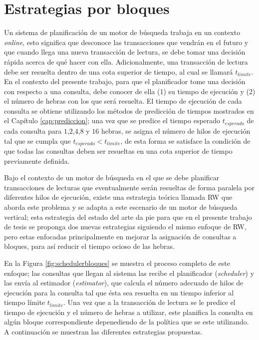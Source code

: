 \section{Estrategias por bloques}
\label{scheduling:bloques}
Un sistema de planificación de un motor de búsqueda trabaja en un contexto \textit{online}, esto significa que desconoce las transacciones que vendrán en el futuro y que cuando llega una nueva transacción de lectura, se debe tomar una decisión rápida acerca de qué hacer con ella. Adicionalmente, una transacción de lectura debe ser resuelta dentro de una cota superior de tiempo, al cual se llamará $t_{limite}$. En el contexto del presente trabajo, para que el planificador tome una decisión con respecto a una consulta, debe conocer de ella (1) su tiempo de ejecución y (2) el número de hebras con los que será resuelta. El tiempo de ejecución de cada consulta se obtiene utilizando los métodos de predicción de tiempos mostrados en el Capítulo \ref{cap:prediccion}; una vez que se predice el tiempo esperado $t_{esperado}$ de cada consulta para $1$,$2$,$4$,$8$ y $16$ hebras, se asigna el número de hilos de ejecución tal que se cumpla que $t_{esperado} < t_{limite}$, de esta forma se satisface la condición de que todas las consultas deben ser resueltas en una cota superior de tiempo previamente definida.

Bajo el contexto de un motor de búsqueda en el que se debe planificar transacciones de lecturas que eventualmente serán resueltas de forma paralela por diferentes hilos de ejecución, existe una estrategia teórica llamada RW que aborda este problema \citep{Ye:2007} y se adapta a este escenario de un motor de búsqueda vertical; esta estrategia del estado del arte da pie para que en el presente trabajo de tesis se proponga dos nuevas estrategias siguiendo el mismo enfoque de RW, pero estas enfocadas principalmente en mejorar la asignación de consultas a bloques, para así reducir el tiempo ocioso de las hebras. 

En la Figura \ref{fig:schedulerbloques} se muestra el proceso completo de este enfoque; las consultas que llegan al sistema las recibe el planificador (\textit{scheduler}) y las envía al estimador (\textit{estimator}), que calcula el número adecuado de hilos de ejecución para la consulta tal que ésta sea resuelta en un tiempo inferior al tiempo límite $t_{limite}$. Una vez que a la transacción de lectura se le predice el tiempo de ejecución y el número de hebras a utilizar, este planifica la consulta en algún bloque correspondiente depenediendo de la política que se este utilizando. A continuación se muestran las diferentes estrategias propuestas. 

